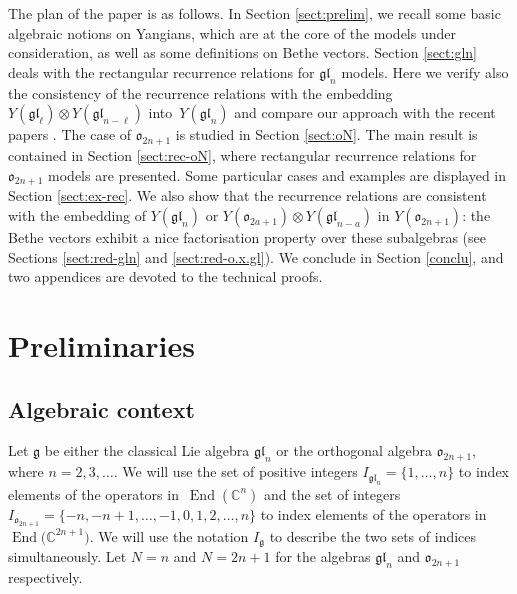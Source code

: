 \documentclass[pdftex]{sigma}
\theoremstyle{definition}
\def\CC{{\mathbb{C}}}
\def\Ig{I_{\mathfrak{g}}}
\begin{document}
The plan of the paper is as follows. In Section \ref{sect:prelim}, we recall some basic algebraic notions
on Yangians, which are at the core of the models under consideration, as well as some definitions on Bethe vectors.
Section \ref{sect:gln} deals with the rectangular recurrence relations for $\mathfrak{gl}_n$ models. Here we verify also the consistency of the recurrence
relations with the embedding $Y(\mathfrak{gl}_{\ell})\otimes
Y(\mathfrak{gl}_{n-\ell})$ into~$Y(\mathfrak{gl}_{n})$ and compare our approach with
the recent papers \cite{KT1,KT2}.
The case of $\mathfrak{o}_{2n+1}$ is studied in Section \ref{sect:oN}. The main result is contained in Section \ref{sect:rec-oN}, where
rectangular recurrence relations for $\mathfrak{o}_{2n+1}$ models are presented.
Some particular cases and examples are displayed in Section \ref{sect:ex-rec}.
We also show that the recurrence relations are consistent with the embedding of $Y(\mathfrak{gl}_n)$
or $Y(\mathfrak{o}_{2a+1})\otimes Y(\mathfrak{gl}_{n-a})$ in
$Y(\mathfrak{o}_{2n+1})$: the Bethe vectors exhibit a nice factorisation property over these subalgebras (see Sections
\ref{sect:red-gln} and \ref{sect:red-o.x.gl}). We conclude in Section \ref{conclu}, and two appendices are devoted to the technical proofs.

\section{Preliminaries\label{sect:prelim}}

\subsection{Algebraic context}
Let $\mathfrak{g}$ be either the classical Lie algebra $\mathfrak{gl}_n$ or the
orthogonal algebra $\mathfrak{o}_{2n+1}$,
where $n=2,3,\dots$.
We will use the set of positive integers
$I_{\mathfrak{gl}_n}=\{1,\dots,n\}$ to index elements of the operators in~$\operatorname{End}({\CC}^{n})$ and the set of integers
$I_{\mathfrak{o}_{2n+1}}=\{-n,-n+1,\dots,-1,0,1,2,\dots,n\}$
to index elements of the operators in $\operatorname{ End}\bigl({\CC}^{2n+1}\bigr)$.
 We will use the notation $\Ig$ to describe the two sets of indices simultaneously.
Let $N=n$ and $N=2n+1$ for the algebras $\mathfrak{gl}_n$ and $\mathfrak{o}_{2n+1}$
respectively.
%
\end{document}
